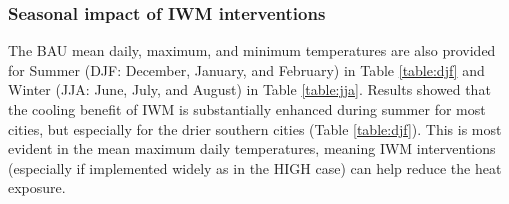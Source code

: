 \documentclass[utf8]{frontiersSCNS} %
\begin{document}
\subsubsection{Seasonal impact of IWM interventions}\label{sec:results2b}

The BAU mean daily, maximum, and minimum temperatures are also provided for Summer (DJF: December, January, and February) in Table \ref{table:djf} and Winter (JJA: June, July, and August) in Table \ref{table:jja}. Results showed that the cooling benefit of IWM is substantially enhanced during summer for most cities, but especially for the drier southern cities (Table \ref{table:djf}). This is most evident in the mean maximum daily temperatures, meaning IWM interventions (especially if implemented widely as in the HIGH case) can help reduce the heat exposure.
\end{document}
